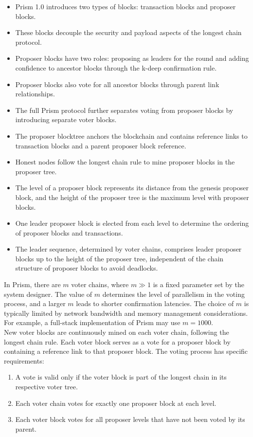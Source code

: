 \begin{itemize}
	\item Prism 1.0 introduces two types of blocks: transaction blocks and proposer blocks.
	\item These blocks decouple the security and payload aspects of the longest chain protocol.
	\item Proposer blocks have two roles: proposing as leaders for the round and adding confidence to ancestor blocks through the k-deep confirmation rule.
	\item Proposer blocks also vote for all ancestor blocks through parent link relationships.
	\item The full Prism protocol further separates voting from proposer blocks by introducing separate voter blocks.
	\item The proposer blocktree anchors the blockchain and contains reference links to transaction blocks and a parent proposer block reference.
	\item Honest nodes follow the longest chain rule to mine proposer blocks in the proposer tree.
	\item The level of a proposer block represents its distance from the genesis proposer block, and the height of the proposer tree is the maximum level with proposer blocks.
	\item One leader proposer block is elected from each level to determine the ordering of proposer blocks and transactions.
	\item The leader sequence, determined by voter chains, comprises leader proposer blocks up to the height of the proposer tree, independent of the chain structure of proposer blocks to avoid deadlocks.
\end{itemize}
In Prism, there are $m$ voter chains, where $m ≫ 1$ is a fixed parameter set by the system designer. The value of $m$ determines the level of parallelism in the voting process, and a larger $m$ leads to shorter confirmation latencies. The choice of $m$ is typically limited by network bandwidth and memory management considerations. For example, a full-stack implementation of Prism may use $m = 1000$.\\
New voter blocks are continuously mined on each voter chain, following the longest chain rule. Each voter block serves as a vote for a proposer block by containing a reference link to that proposer block. The voting process has specific requirements: 
\begin{enumerate}
	\item A vote is valid only if the voter block is part of the longest chain in its respective voter tree.
	\item Each voter chain votes for exactly one proposer block at each level.
	\item Each voter block votes for all proposer levels that have not been voted by its parent.
\end{enumerate}
